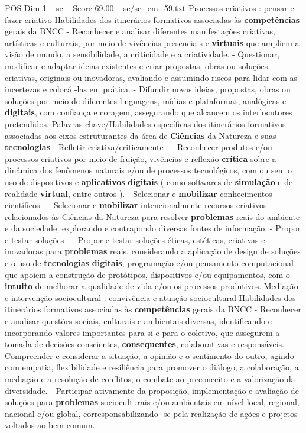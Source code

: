 \begin{textsample}{POS Dim 1 – sc – Score 69.00 – sc/sc\_em\_59.txt}
Processos criativos : pensar e fazer criativo Habilidades dos itinerários formativos associadas às \textbf{competências} gerais da BNCC - Reconhecer e analisar diferentes manifestações criativas, artísticas e culturais, por meio de vivências presenciais e \textbf{virtuais} que ampliem a visão de mundo, a sensibilidade, a criticidade e a criatividade. - Questionar, modificar e adaptar ideias existentes e criar propostas, obras ou soluções criativas, originais ou inovadoras, avaliando e assumindo riscos para lidar com as incertezas e colocá -las em prática. - Difundir novas ideias, propostas, obras ou soluções por meio de diferentes linguagens, mídias e plataformas, analógicas e \textbf{digitais}, com confiança e coragem, assegurando que alcancem os interlocutores pretendidos.
Palavras-chave/Habilidades específicas dos itinerários formativos associadas aos eixos estruturantes da área de \textbf{Ciências} da Natureza e suas \textbf{tecnologias} - Refletir criativa/criticamente — Reconhecer produtos e/ou processos criativos por meio de fruição, vivências e reflexão \textbf{crítica} sobre a dinâmica dos fenômenos naturais e/ou de processos tecnológicos, com ou sem o uso de dispositivos e \textbf{aplicativos} \textbf{digitais} ( como softwares de \textbf{simulação} e de realidade \textbf{virtual}, entre outros ). - Selecionar e \textbf{mobilizar} conhecimentos científicos — Selecionar e \textbf{mobilizar} intencionalmente recursos criativos relacionados às Ciências da Natureza para resolver \textbf{problemas} reais do ambiente e da sociedade, explorando e contrapondo diversas fontes de informação. - Propor e testar soluções — Propor e testar soluções éticas, estéticas, criativas e inovadoras para \textbf{problemas} reais, considerando a aplicação de design de soluções e o uso de \textbf{tecnologias} \textbf{digitais}, programação e/ou pensamento computacional que apoiem a construção de protótipos, dispositivos e/ou equipamentos, com o \textbf{intuito} de melhorar a qualidade de vida e/ou os processos produtivos.
Mediação e intervenção sociocultural : convivência e atuação sociocultural Habilidades dos itinerários formativos associadas às \textbf{competências} gerais da BNCC - Reconhecer e analisar questões sociais, culturais e ambientais diversas, identificando e incorporando valores importantes para si e para o coletivo, que assegurem a tomada de decisões conscientes, \textbf{consequentes}, colaborativas e responsáveis. - Compreender e considerar a situação, a opinião e o sentimento do outro, agindo com empatia, flexibilidade e resiliência para promover o diálogo, a colaboração, a mediação e a resolução de conflitos, o combate ao preconceito e a valorização da diversidade. - Participar ativamente da proposição, implementação e avaliação de soluções para \textbf{problemas} socioculturais e/ou ambientais em nível local, regional, nacional e/ou global, corresponsabilizando -se pela realização de ações e projetos voltados ao bem comum.

\end{textsample}
